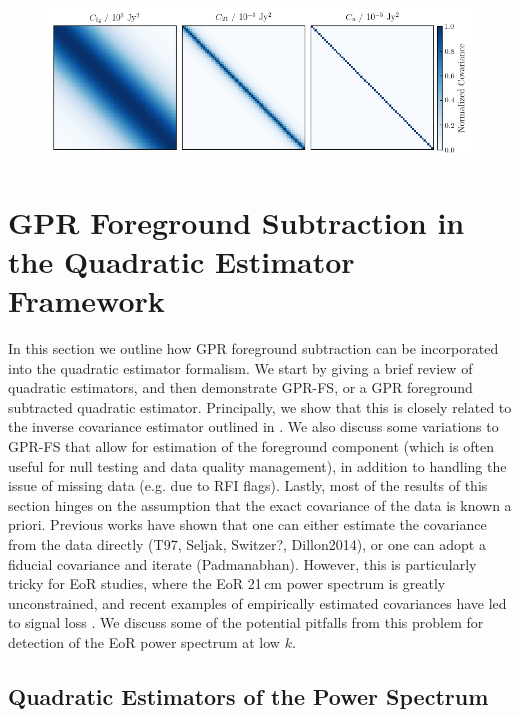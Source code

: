 \documentclass[a4paper,fleqn,usenatbib]{mnras}
\begin{document}
\begin{figure}
\centering
\includegraphics[scale=0.8]{imgs/data_covariance.png}
\caption{}
\label{fig:data_covariance}
\end{figure}

\section{GPR Foreground Subtraction in the Quadratic Estimator Framework}
\label{sec:gprfs}

In this section we outline how GPR foreground subtraction can be incorporated into the quadratic estimator formalism.
We start by giving a brief review of quadratic estimators, and then demonstrate GPR-FS, or a GPR foreground subtracted quadratic estimator.
Principally, we show that this is closely related to the inverse covariance estimator outlined in \citet{Liu2011}.
We also discuss some variations to GPR-FS that allow for estimation of the foreground component (which is often useful for null testing and data quality management), in addition to handling the issue of missing data (e.g. due to RFI flags).
Lastly, most of the results of this section hinges on the assumption that the exact covariance of the data is known a priori.
Previous works have shown that one can either estimate the covariance from the data directly (T97, Seljak, Switzer?, Dillon2014), or one can adopt a fiducial covariance and iterate (Padmanabhan).
However, this is particularly tricky for EoR studies, where the EoR 21\,cm power spectrum is greatly unconstrained, and recent examples of empirically estimated covariances have led to signal loss \citep{Cheng2018}.
We discuss some of the potential pitfalls from this problem for detection of the EoR power spectrum at low $k$.

\subsection{Quadratic Estimators of the Power Spectrum}
\label{sec:qe}
\end{document}
